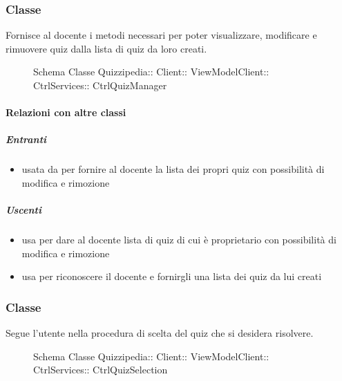 \subsubsection{Classe }
Fornisce al docente i metodi necessari per poter visualizzare, modificare e rimuovere quiz dalla lista di quiz da loro creati.
\begin{figure}[H]
\centering
\noindent{}
\caption[Schema Classe CtrlQuizManager]{Schema Classe Quizzipedia:: Client:: ViewModelClient:: CtrlServices:: CtrlQuizManager}
\end{figure}
\paragraph{Relazioni con altre classi}
\subparagraph{Entranti}
\begin{itemize}
\item usata da  per fornire al docente la lista dei propri quiz con possibilità di modifica e rimozione
\end{itemize}
\subparagraph{Uscenti}
\begin{itemize}
\item usa  per dare al docente lista di quiz di cui è proprietario con possibilità di modifica e rimozione
\item usa  per riconoscere il docente e fornirgli una lista dei quiz da lui creati
\end{itemize}
\subsubsection{Classe }
Segue l'utente nella procedura di scelta del quiz che si desidera risolvere.
\begin{figure}[H]
\centering
\noindent{}
\caption[Schema Classe CtrlQuizSelection]{Schema Classe Quizzipedia:: Client:: ViewModelClient:: CtrlServices:: CtrlQuizSelection}
\end{figure}
